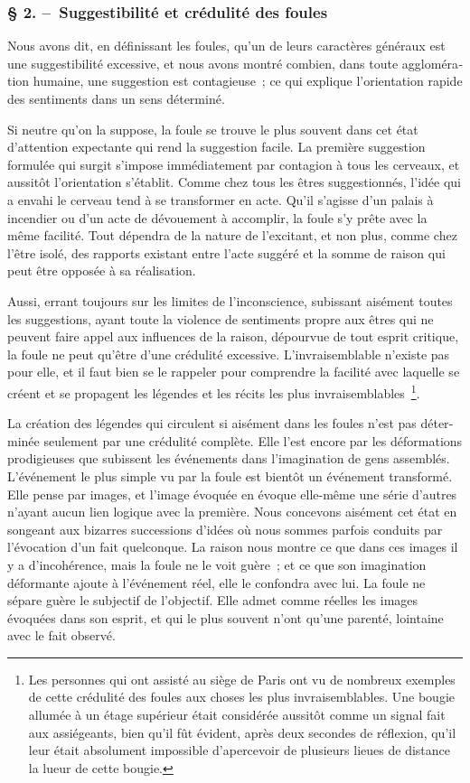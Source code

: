 \documentclass[french,twoside]{book} %
\begin{document}
\subsubsection[{§ 2. – Suggestibilité et crédulité des foules}]{§ 2. – Suggestibilité et crédulité des foules}
\noindent Nous avons dit, en définissant les foules, qu’un de leurs caractères généraux est une suggestibilité excessive, et nous avons montré combien, dans toute aggloméra­tion humaine, une suggestion est contagieuse ; ce qui explique l’orientation rapide des sentiments dans un sens déterminé.\par
Si neutre qu’on la suppose, la foule se trouve le plus souvent dans cet état d’atten­tion expectante qui rend la suggestion facile. La première suggestion formulée qui surgit s’impose immédiatement par contagion à tous les cerveaux, et aussitôt l’orienta­tion s’établit. Comme chez tous les êtres suggestionnés, l’idée qui a envahi le cerveau tend à se transformer en acte. Qu’il s’agisse d’un palais à incendier ou d’un acte de dévouement à accomplir, la foule s’y prête avec la même facilité. Tout dépendra de la nature de l’excitant, et non plus, comme chez l’être isolé, des rapports existant entre l’acte suggéré et la somme de raison qui peut être opposée à sa réalisation.\par
Aussi, errant toujours sur les limites de l’inconscience, subissant aisément toutes les suggestions, ayant toute la violence de sentiments propre aux êtres qui ne peuvent faire appel aux influences de la raison, dépourvue de tout esprit critique, la foule ne peut qu’être d’une crédulité excessive. L’invraisemblable n’existe pas pour elle, et il faut bien se le rappeler pour comprendre la facilité avec laquelle se créent et se pro­pagent les légendes et les récits les plus invraisemblables \footnote{Les personnes qui ont assisté au siège de Paris ont vu de nombreux exemples de cette crédulité des foules aux choses les plus invraisemblables. Une bougie allumée à un étage supérieur était considérée aussitôt comme un signal fait aux assiégeants, bien qu’il fût évident, après deux secondes de réflexion, qu’il leur était absolument impossible d’apercevoir de plusieurs lieues de distance la lueur de cette bougie.}.\par
La création des légendes qui circulent si aisément dans les foules n’est pas déter­minée seulement par une crédulité complète. Elle l’est encore par les déformations prodigieuses que subissent les événements dans l’imagination de gens assemblés. L’événement le plus simple vu par la foule est bientôt un événement transformé. Elle pense par images, et l’image évoquée en évoque elle-même une série d’autres n’ayant aucun lien logique avec la première. Nous concevons aisément cet état en songeant aux bizarres successions d’idées où nous sommes parfois conduits par l’évocation d’un fait quelconque. La raison nous montre ce que dans ces images il y a d’incohérence, mais la foule ne le voit guère ; et ce que son imagination déformante ajoute à l’événe­ment réel, elle le confondra avec lui. La foule ne sépare guère le subjectif de l’objec­tif. Elle admet comme réelles les images évoquées dans son esprit, et qui le plus souvent n’ont qu’une parenté, lointaine avec le fait observé.\par
\end{document}
